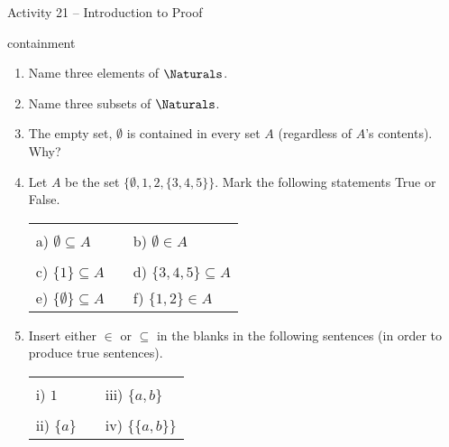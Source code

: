 \documentclass{amsart}
\begin{document}
\thispagestyle{empty}

\centerline{\Large Activity 21 -- Introduction to Proof}
\centerline{\large containment}

\bigskip
\Large


\begin{enumerate}

\item Name three elements of $\Naturals$.  

\vfill

\item Name three subsets of $\Naturals$. 

\vfill

\item The empty set, $\emptyset$ is contained in every set $A$ (regardless of $A$'s contents).  Why?

\vfill

\item Let $A$ be the set $\{ \emptyset, 1, 2, \{3, 4, 5\} \}$.
Mark the following statements True or False.

\begin{tabular}{lcl}
\rule{0pt}{60pt}a)  $\emptyset \subseteq A$ & \rule{72pt}{0pt} & b)  $\emptyset \in A$ \\
\rule{0pt}{60pt}c)  $ \{1\} \subseteq A$ & & d) $ \{3, 4, 5\}  \subseteq A$ \\
\rule[-60pt]{0pt}{120pt}e)  $ \{ \emptyset \} \subseteq A$ & & f) $\{ 1, 2 \} \in A$\\
\end{tabular}

\newpage

\item Insert either $\in$ or $\subseteq$ in the blanks in the following 
sentences (in order to produce true sentences).

\vspace{.1in}

\begin{tabular}{lcl}
\rule{0pt}{16pt}i) $1$ \underline{\rule{36pt}{0pt}} $\{3, 2, 1, \{a, b\}\}$ & \rule{36pt}{0pt} & iii) $\{a, b\}$  \underline{\rule{36pt}{0pt}} $\{3, 2, 1, \{a, b\}\}$ \\
\rule{0pt}{16pt}ii) $\{a\}$ \underline{\rule{36pt}{0pt}} $\{a, \{a, b\}\}$ & &
iv) $\{\{a, b\}\}$  \underline{\rule{36pt}{0pt}} $\{a, \{a, b\}\}$ \\
\end{tabular}

\vspace{.2in}



\end{enumerate}
\end{document}
